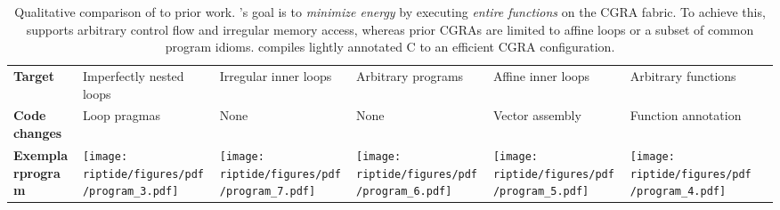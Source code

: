 {\begin{table*}[t]
{\begin{tabular}{p{0.4in}P{1.25in}P{1.25in}P{1.25in}P{1.25in}P{1.25in}P{1.35in}}
                        \bf Target
                        & Imperfectly nested loops
                        & Irregular inner loops
                        & Arbitrary programs
                        & Affine inner loops
                        & Arbitrary functions \\[1.5ex]
                        \bf Code changes
                        & Loop pragmas
                        & None
                        & None
                        & Vector assembly
                        & Function annotation \\[.5ex]
                        \bf \vspace{-6.25em}Exemplar\newline program
                        &
			\texttt{[image: riptide/figures/pdf/program\_3.pdf]} &
			\texttt{[image: riptide/figures/pdf/program\_7.pdf]} &
			\texttt{[image: riptide/figures/pdf/program\_6.pdf]} &
			\texttt{[image: riptide/figures/pdf/program\_5.pdf]} &
			\texttt{[image: riptide/figures/pdf/program\_4.pdf]} \\
			\bottomrule
		\end{tabular}
	}
	\caption{Qualitative comparison of \riptide to prior work.
          \riptide's goal is to \emph{minimize energy}
          by executing \emph{entire functions} on the CGRA fabric.
          To achieve this, \riptide supports arbitrary control flow and irregular memory access,
          whereas prior CGRAs are limited to affine loops or a subset of common program idioms.
          \riptide compiles lightly annotated C to an efficient CGRA configuration.
        }
	\label{tab:riptide:background}
\end{table*}
}

